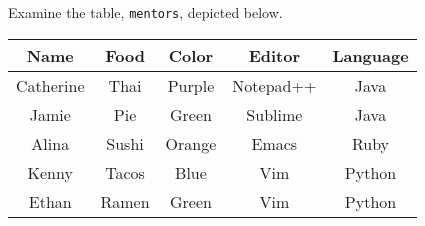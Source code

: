 Examine the table, \texttt{mentors}, depicted below.

\begin{center}
\begin{tabular}{|c|c|c|c|c|}
 \hline
 \textbf{Name} & \textbf{Food} & \textbf{Color} & \textbf{Editor} & \textbf{Language} \\
 \hline
 Catherine & Thai & Purple & Notepad++ & Java \\
 \hline
 Jamie & Pie & Green & Sublime & Java \\
 \hline
 Alina & Sushi & Orange & Emacs & Ruby \\
 \hline
 Kenny & Tacos & Blue & Vim & Python \\
 \hline
 Ethan & Ramen & Green & Vim & Python \\
 \hline
\end{tabular}
\end{center}
